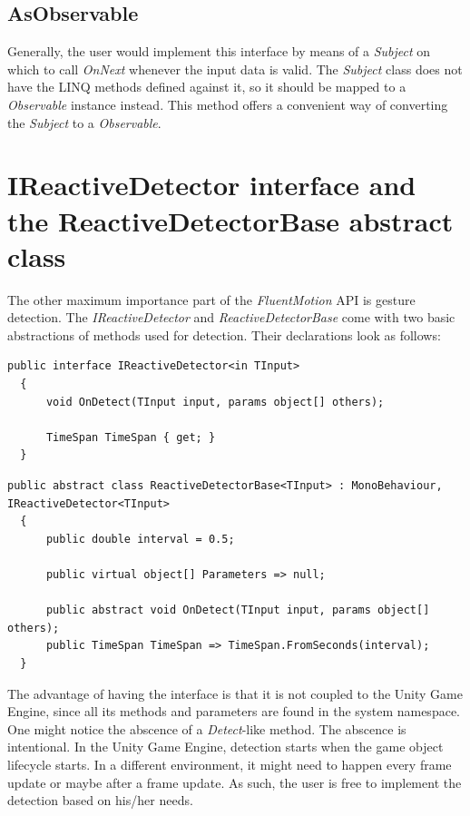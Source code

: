 \documentclass[12pt,a4paper,twoside]{report}
\begin{document}
\subsection{AsObservable}
Generally, the user would implement this interface by means of a \textit{Subject} on which to call \textit{OnNext} whenever the input data is valid. The \textit{Subject} class does not have the LINQ methods defined against it, so it should be mapped to a \textit{Observable} instance instead. This method offers a convenient way of converting the \textit{Subject} to a \textit{Observable}.

\section{IReactiveDetector interface and the ReactiveDetectorBase abstract class}
The other maximum importance part of the \textit{FluentMotion} API is gesture detection. The \textit{IReactiveDetector} and \textit{ReactiveDetectorBase} come with two basic abstractions of methods used for detection. Their declarations look as follows:

\begin{lstlisting}[caption=IReactiveDetector interface]
  public interface IReactiveDetector<in TInput>
  {
      void OnDetect(TInput input, params object[] others);

      TimeSpan TimeSpan { get; }
  }
\end{lstlisting}

\begin{lstlisting}[caption=ReactiveDetectorBase abstract class]
  public abstract class ReactiveDetectorBase<TInput> : MonoBehaviour, IReactiveDetector<TInput>
  {
      public double interval = 0.5;

      public virtual object[] Parameters => null;

      public abstract void OnDetect(TInput input, params object[] others);
      public TimeSpan TimeSpan => TimeSpan.FromSeconds(interval);
  }
\end{lstlisting}

The advantage of having the interface is that it is not coupled to the Unity Game Engine, since all its methods and parameters are found in the system namespace. One might notice the abscence of a \textit{Detect}-like method. The abscence is intentional. In the Unity Game Engine, detection starts when the game object lifecycle starts. In a different environment, it might need to happen every frame update or maybe after a frame update. As such, the user is free to implement the detection based on his/her needs.
\end{document}
